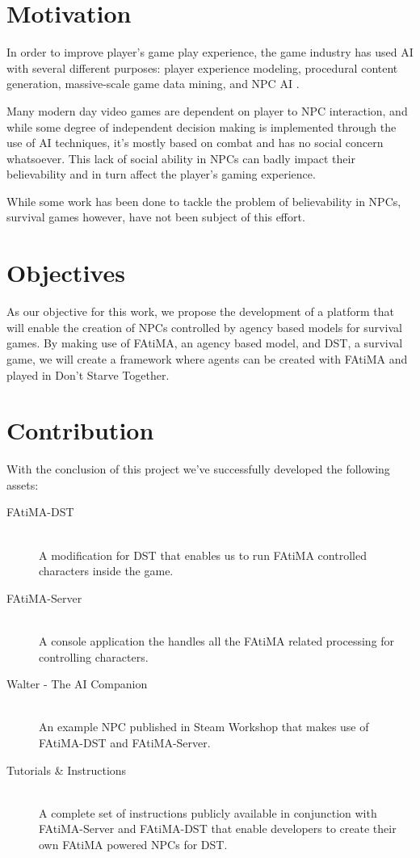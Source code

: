 \section{Motivation}

\noindent In order to improve player's game play experience, the game industry has used \ac{AI} with several different purposes: player experience modeling, procedural content generation, massive-scale game data mining, and \ac{NPC} \ac{AI} \cite{yannakakis:gameairevisited}.

Many modern day video games are dependent on player to \ac{NPC} interaction, and while
some degree of independent decision making is implemented through the use of \ac{AI} techniques, it’s mostly based on combat and has no social concern whatsoever.
This lack of social ability in \acp{NPC} can badly impact their believability and in turn affect the player's gaming experience.

While some work has been done to tackle the problem of believability in \acp{NPC}, survival games however, have not been subject of this effort.

\section{Objectives}

\noindent As our objective for this work, we propose the development of a platform that will enable the creation of \acp{NPC} controlled by agency based models for survival games. 
By making use of \ac{FAtiMA}, an agency based model, and \ac{DST}, a survival game, we will create a framework where agents can be created with FAtiMA and played in Don't Starve Together.

\section{Contribution}

\noindent With the conclusion of this project we've successfully developed the following assets:
\begin{description}
  \item[FAtiMA-DST] \hfill \\ A modification for \ac{DST} that enables us to run FAtiMA controlled characters inside the game.
  \item[FAtiMA-Server] \hfill \\ A console application the handles all the FAtiMA related processing for controlling characters.
  \item[Walter - The AI Companion] \hfill \\ An example \ac{NPC} published in Steam Workshop that makes use of FAtiMA-DST and FAtiMA-Server.
  \item[Tutorials \& Instructions] \hfill \\ A complete set of instructions publicly available in conjunction with FAtiMA-Server and FAtiMA-DST that enable developers to create their own FAtiMA powered \acp{NPC} for \ac{DST}.
\end{description}

